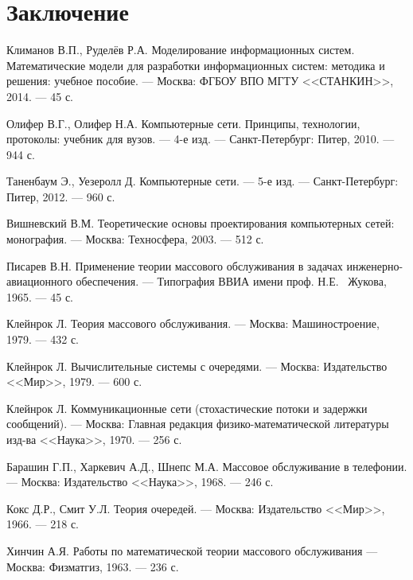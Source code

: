 \documentclass[oneside, draft, 14pt, a4paper]{extreport}
\begin{document}
\chapter*{\centering Заключение}

\renewcommand{\bibname}{\centering Список литературы}
\begin{thebibliography}{00}

 Климанов В.П., Руделёв Р.А.
Моделирование информационных систем. Математические модели для разработки информационных систем: методика и решения: учебное пособие.
--- Москва: ФГБОУ ВПО МГТУ <<СТАНКИН>>, 2014.
--- 45 с.

 Олифер В.Г., Олифер Н.А.
Компьютерные сети. Принципы, технологии, протоколы: учебник для вузов.
--- 4-е изд.
--- Санкт-Петербург: Питер, 2010.
--- 944 с.

 Таненбаум Э., Уезеролл Д.
Компьютерные сети.
--- 5-е изд.
--- Санкт-Петербург: Питер, 2012.
--- 960 с.

 Вишневский В.М.
Теоретические основы проектирования компьютерных сетей: монография.
--- Москва: Техносфера, 2003.
--- 512 с.

 Писарев В.Н.
Применение теории массового обслуживания в задачах инженерно-авиационного обеспечения.
--- Типография ВВИА имени проф. Н.Е. ~Жукова, 1965.
--- 45 с.

 Клейнрок Л.
Теория массового обслуживания.
--- Москва: Машиностроение, 1979.
--- 432 с.

 Клейнрок Л.
Вычислительные системы с очередями.
--- Москва: Издательство <<Мир>>, 1979.
--- 600 с.

 Клейнрок Л.
Коммуникационные сети (стохастические потоки и задержки сообщений).
--- Москва: Главная редакция физико-математической литературы изд-ва <<Наука>>, 1970.
--- 256 с.

 Барашин Г.П., Харкевич А.Д., Шнепс М.А.
Массовое обслуживание в телефонии.
--- Москва: Издательство <<Наука>>, 1968.
--- 246 с.

 Кокс Д.Р., Смит У.Л.
Теория очередей.
--- Москва: Издательство <<Мир>>, 1966.
--- 218 с.

 Хинчин А.Я.
Работы по математической теории массового обслуживания
--- Москва: Физматгиз, 1963.
--- 236 с.

\end{thebibliography}
\end{document}
